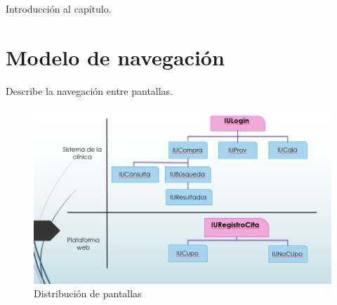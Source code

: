 Introducción al capítulo.

\section{Modelo de navegación}

Describe la navegación entre pantallas.

\begin{figure}[htbp]
	\begin{center}
		\includegraphics[width=.9\textwidth]{images/gui/nav-pantallas}
		\caption{Distribuci\'on de pantallas}
		\label{fig:mapa}
	\end{center}
\end{figure}

